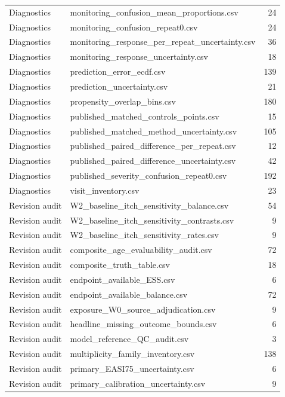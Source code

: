 \begin{longtable}{p{20mm}p{115mm}r}
Diagnostics & monitoring\_confusion\_mean\_proportions.csv & 24 \\
Diagnostics & monitoring\_confusion\_repeat0.csv & 24 \\
Diagnostics & monitoring\_response\_per\_repeat\_uncertainty.csv & 36 \\
Diagnostics & monitoring\_response\_uncertainty.csv & 18 \\
Diagnostics & prediction\_error\_ecdf.csv & 139 \\
Diagnostics & prediction\_uncertainty.csv & 21 \\
Diagnostics & propensity\_overlap\_bins.csv & 180 \\
Diagnostics & published\_matched\_controls\_points.csv & 15 \\
Diagnostics & published\_matched\_method\_uncertainty.csv & 105 \\
Diagnostics & published\_paired\_difference\_per\_repeat.csv & 12 \\
Diagnostics & published\_paired\_difference\_uncertainty.csv & 42 \\
Diagnostics & published\_severity\_confusion\_repeat0.csv & 192 \\
Diagnostics & visit\_inventory.csv & 23 \\
Revision audit & W2\_baseline\_itch\_sensitivity\_balance.csv & 54 \\
Revision audit & W2\_baseline\_itch\_sensitivity\_contrasts.csv & 9 \\
Revision audit & W2\_baseline\_itch\_sensitivity\_rates.csv & 9 \\
Revision audit & composite\_age\_evaluability\_audit.csv & 72 \\
Revision audit & composite\_truth\_table.csv & 18 \\
Revision audit & endpoint\_available\_ESS.csv & 6 \\
Revision audit & endpoint\_available\_balance.csv & 72 \\
Revision audit & exposure\_W0\_source\_adjudication.csv & 9 \\
Revision audit & headline\_missing\_outcome\_bounds.csv & 6 \\
Revision audit & model\_reference\_QC\_audit.csv & 3 \\
Revision audit & multiplicity\_family\_inventory.csv & 138 \\
Revision audit & primary\_EASI75\_uncertainty.csv & 6 \\
Revision audit & primary\_calibration\_uncertainty.csv & 9 \\

\end{longtable}
